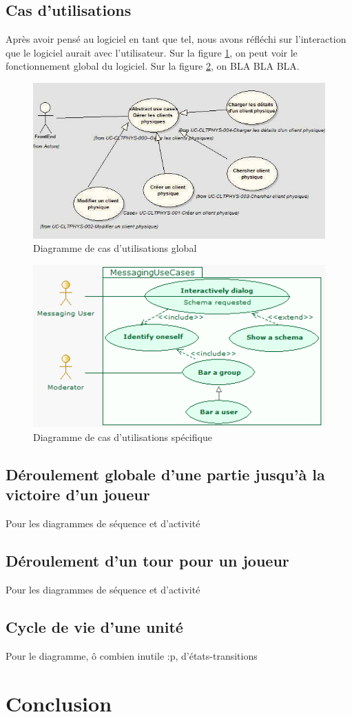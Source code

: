 \documentclass[12pt]{article}
\begin{document}
\subsection{Cas d'utilisations}
Après avoir pensé au logiciel en tant que tel, nous avons réfléchi sur l'interaction que le logiciel aurait avec l'utilisateur. Sur la figure \ref{casdut1}, on peut voir le fonctionnement global du logiciel. Sur la figure \ref{casdut2}, on BLA BLA BLA.

\begin{figure}[!h] 
\centerline{\includegraphics[scale=0.60]{diag_cas_dut_ex.jpeg}}
   \caption{\label{étiquette} Diagramme de cas d'utilisations global}
\label{casdut1}
\end{figure}

\begin{figure}[!h] 
\centerline{\includegraphics[scale=0.60]{diag_cas_dut2_ex.jpeg}}
   \caption{\label{étiquette} Diagramme de cas d'utilisations spécifique}
\label{casdut2}
\end{figure}

\subsection{Déroulement globale d'une partie jusqu'à la victoire d'un joueur}
Pour les diagrammes de séquence et d'activité
\subsection{Déroulement d'un tour pour un joueur}
Pour les diagrammes de séquence et d'activité

\subsection{Cycle de vie d'une unité}
Pour le diagramme, ô combien inutile :p, d'états-transitions
\newpage

\section{Conclusion}

\newpage



\end{document}

